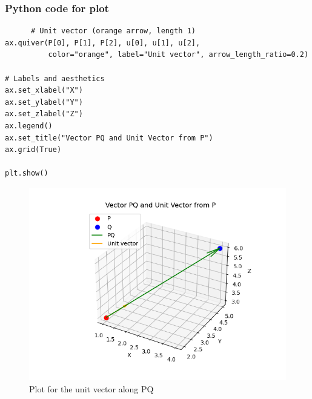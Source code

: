 \documentclass{beamer}
\begin{document}
 \begin{frame}[fragile]
       \frametitle{Python code for plot}
       \begin{lstlisting}
      # Unit vector (orange arrow, length 1)
ax.quiver(P[0], P[1], P[2], u[0], u[1], u[2],
          color="orange", label="Unit vector", arrow_length_ratio=0.2)

# Labels and aesthetics
ax.set_xlabel("X")
ax.set_ylabel("Y")
ax.set_zlabel("Z")
ax.legend()
ax.set_title("Vector PQ and Unit Vector from P")
ax.grid(True)

plt.show()
    \end{lstlisting}
 \end{frame}
 \begin{figure}
     \centering
     \includegraphics[width=0.7\linewidth]{figs/fig22.png}
     \caption{Plot for the unit vector along PQ}
     \label{fig2}
 \end{figure}
\end{document}
